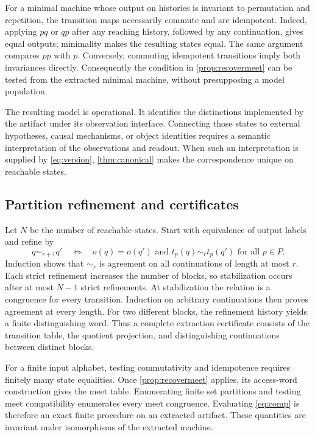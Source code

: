 For a minimal machine whose output on histories is invariant to permutation and repetition, the transition maps necessarily commute and are idempotent. Indeed, applying $pq$ or $qp$ after any reaching history, followed by any continuation, gives equal outputs; minimality makes the resulting states equal. The same argument compares $pp$ with $p$. Conversely, commuting idempotent transitions imply both invariances directly. Consequently the condition in \cref{prop:recovermeet} can be tested from the extracted minimal machine, without presupposing a model population.

The resulting model is operational. It identifies the distinctions implemented by the artifact under its observation interface. Connecting those states to external hypotheses, causal mechanisms, or object identities requires a semantic interpretation of the observations and readout. When such an interpretation is supplied by \eqref{eq:version}, \cref{thm:canonical} makes the correspondence unique on reachable states.

\subsection{Partition refinement and certificates}
Let $N$ be the number of reachable states. Start with equivalence of output labels and refine by
\[
 q\sim_{r+1}q'
 \quad\Longleftrightarrow\quad
 o(q)=o(q')\text{ and }t_p(q)\sim_rt_p(q')\text{ for all }p\in P.
\]
Induction shows that $\sim_r$ is agreement on all continuations of length at most $r$. Each strict refinement increases the number of blocks, so stabilization occurs after at most $N-1$ strict refinements. At stabilization the relation is a congruence for every transition. Induction on arbitrary continuations then proves agreement at every length. For two different blocks, the refinement history yields a finite distinguishing word. Thus a complete extraction certificate consists of the transition table, the quotient projection, and distinguishing continuations between distinct blocks.

For a finite input alphabet, testing commutativity and idempotence requires finitely many state equalities. Once \cref{prop:recovermeet} applies, its access-word construction gives the meet table. Enumerating finite set partitions and testing meet compatibility enumerates every meet congruence. Evaluating \eqref{eq:comp} is therefore an exact finite procedure on an extracted artifact. These quantities are invariant under isomorphisms of the extracted machine.


